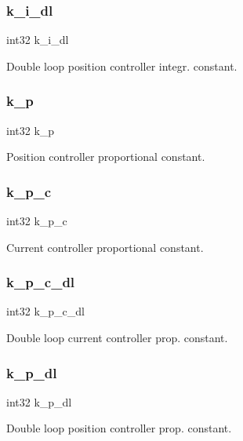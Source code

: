 \subsubsection{k\+\_\+i\+\_\+dl}
{\footnotesize\ttfamily int32 k\+\_\+i\+\_\+dl}

Double loop position controller integr. constant. \mbox{\label{structst__mem_ad1bc394122aa9760c3fc2887a1891cd8}} 
\subsubsection{k\+\_\+p}
{\footnotesize\ttfamily int32 k\+\_\+p}

Position controller proportional constant. \mbox{\label{structst__mem_ac3311db4a733f35aa5ed2672cb162f96}} 
\subsubsection{k\+\_\+p\+\_\+c}
{\footnotesize\ttfamily int32 k\+\_\+p\+\_\+c}

Current controller proportional constant. \mbox{\label{structst__mem_a63c3f3c01d6757cafdb40043adce404e}} 
\subsubsection{k\+\_\+p\+\_\+c\+\_\+dl}
{\footnotesize\ttfamily int32 k\+\_\+p\+\_\+c\+\_\+dl}

Double loop current controller prop. constant. \mbox{\label{structst__mem_a047226f308f4365d9d0036d71b6ed910}} 
\subsubsection{k\+\_\+p\+\_\+dl}
{\footnotesize\ttfamily int32 k\+\_\+p\+\_\+dl}

Double loop position controller prop. constant. \mbox{\label{structst__mem_aecf0baab567443534c0ded663b746896}} 
